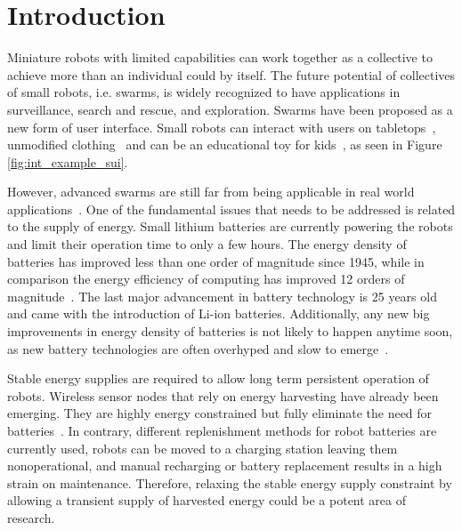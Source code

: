 \chapter{Introduction}
\label{chp:introduction}




Miniature robots with limited capabilities can work together as a collective to achieve more than an individual could by itself.
The future potential of collectives of small robots, i.e. swarms, is widely recognized to have applications in surveillance, search and rescue, and exploration.
Swarms have been proposed as a new form of user interface.
Small robots can interact with users on tabletops~\cite{legoc_uist_2016}, unmodified clothing~\cite{dementyev_uist_2016} and can be an educational toy for kids~\cite{sony_toio_2017}, as seen in Figure \ref{fig:int_example_sui}.


However, advanced swarms are still far from being applicable in real world applications~\cite{barca_sekercioglu_2013}. 
One of the fundamental issues that needs to be addressed is related to the supply of energy.
Small lithium batteries are currently powering the robots and limit their operation time to only a few hours. 
The energy density of batteries has improved less than one order of magnitude since 1945, while in comparison the energy efficiency of computing has improved 12 orders of magnitude~\cite{patel_pvc_2017}.
The last major advancement in battery technology is 25 years old and came with the introduction of Li-ion batteries.
Additionally, any new big improvements in energy density of batteries is not likely to happen anytime soon, as new battery technologies are often overhyped and slow to emerge~\cite{zachary_spec_2016}.



Stable energy supplies are required to allow long term persistent operation of robots.
Wireless sensor nodes that rely on energy harvesting have already been emerging. They are highly energy constrained but fully eliminate the need for batteries~\cite{wisp5_wiki_2017}.
In contrary, different replenishment methods for robot batteries are currently used, robots can be moved to a charging station leaving them nonoperational, and manual recharging or battery replacement results in a high strain on maintenance.
Therefore, relaxing the stable energy supply constraint by allowing a transient supply of harvested energy could be a potent area of research.

